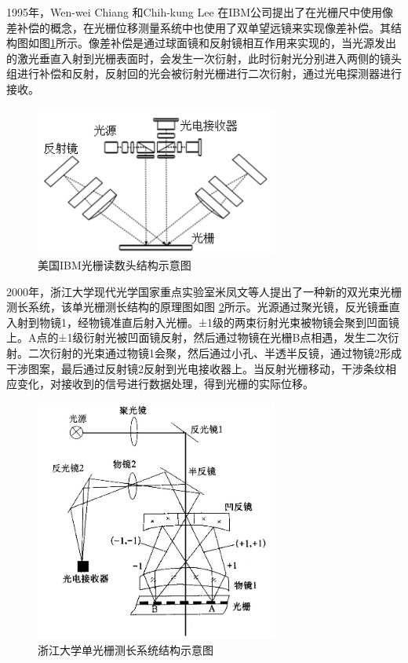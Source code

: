\documentclass[type=master,oneside]{fduthesis}
\begin{document}
1995年，Wen-wei Chiang 和Chih-kung Lee 在IBM公司\cite{chiang1995wavefront}提出了在光栅尺中使用像差补偿的概念，在光栅位移测量系统中也使用了双单望远镜来实现像差补偿。其结构图如图\ref{fig:美国IBM光栅读数头结构示意图}所示。像差补偿是通过球面镜和反射镜相互作用来实现的，当光源发出的激光垂直入射到光栅表面时，会发生一次衍射，此时衍射光分别进入两侧的镜头组进行补偿和反射，反射回的光会被衍射光栅进行二次衍射，通过光电探测器进行接收。
\begin{figure}[htb]
  \centering
  \includegraphics[width=8cm]{1-fig/IBM.png}
  \caption{美国IBM光栅读数头结构示意图}
  \label{fig:美国IBM光栅读数头结构示意图}
\end{figure}

2000年，浙江大学现代光学国家重点实验室米凤文\cite{米凤文20000}等人提出了一种新的双光束光栅测长系统，该单光栅测长结构的原理图如图 \ref{fig:浙江大学单光栅测长系统结构示意图}所示。光源通过聚光镜，反光镜垂直入射到物镜1，经物镜准直后射入光栅。±1级的两束衍射光束被物镜会聚到凹面镜上。A点的±1级衍射光被凹面镜反射，然后通过物镜在光栅B点相遇，发生二次衍射。二次衍射的光束通过物镜1会聚，然后通过小孔、半透半反镜，通过物镜2形成干涉图案，最后通过反射镜2反射到光电接收器上。当反射光栅移动，干涉条纹相应变化，对接收到的信号进行数据处理，得到光栅的实际位移。
\begin{figure}[H]
  \centering
  \includegraphics[width=8cm]{1-fig/浙江大学.jpg}
  \caption{浙江大学单光栅测长系统结构示意图}
  \label{fig:浙江大学单光栅测长系统结构示意图}
\end{figure}
\end{document}
